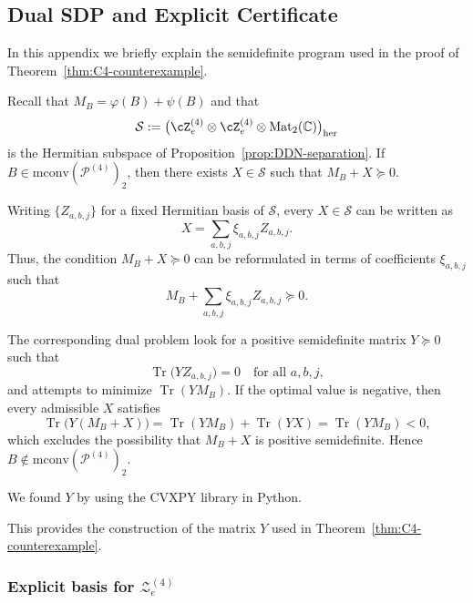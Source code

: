 \documentclass[11pt, a4paper]{article}
\theoremstyle{plain}
\theoremstyle{definition}
\theoremstyle{remark}
\newcommand{\C}{\mathbb{C}}
\newcommand{\cP}{\mathcal{P}} \newcommand{\cQ}{\mathcal{Q}} \newcommand{\cR}{\mathcal{R}}
\DeclareMathOperator{\Tr}{Tr}
\newcommand{\Mat}[2]{\operatorname{Mat}_{#2}\!\left(#1\right)}
\begin{document}
\subsection{Dual SDP and Explicit Certificate}\label{sec:dual-certificate}

In this appendix we briefly explain the semidefinite program used in the proof of
Theorem~\ref{thm:C4-counterexample}.

Recall that \(M_B = \varphi(B) + \psi(B)\) and that
\[
\mathcal{S}
 := \bigl(\cZ_e^{(4)} \otimes \cZ_e^{(4)}
          \otimes \Mat{\C}{2}\bigr)_{\mathrm{her}}
\]
is the Hermitian subspace of
Proposition~\ref{prop:DDN-separation}.
If \(B \in \mathrm{mconv}(\cP^{(4)})_2\), then there exists
\(X \in \mathcal{S}\) such that \(M_B + X \succeq 0\).

Writing \(\{Z_{a,b,j}\}\) for a fixed Hermitian basis of \(\mathcal{S}\),
every \(X \in \mathcal{S}\) can be written as
\[
X = \sum_{a,b,j} \xi_{a,b,j} Z_{a,b,j}.
\]
Thus, the condition \(M_B+X\succeq 0\) can be reformulated
in terms of coefficients \(\xi_{a,b,j}\) such that
\[
M_B + \sum_{a,b,j} \xi_{a,b,j} Z_{a,b,j} \succeq 0.
\]

The corresponding dual problem look for a positive semidefinite
matrix \(Y \succeq 0\) such that
\[
\Tr\!\bigl(Y Z_{a,b,j}\bigr) = 0
\quad\text{for all }a,b,j,
\]
and attempts to minimize \(\Tr(Y M_B)\).
If the optimal value is negative, then every admissible \(X\) satisfies
\[
\Tr\!\bigl(Y(M_B+X)\bigr)
 = \Tr(Y M_B) + \Tr(YX)
 = \Tr(Y M_B) < 0,
\]
which excludes the possibility that \(M_B + X\) is positive semidefinite.
Hence \(B \notin \mathrm{mconv}(\cP^{(4)})_2\).

We found \(Y\) by using the
CVXPY library in Python.  

This provides the construction of the matrix \(Y\) used in
Theorem~\ref{thm:C4-counterexample}.

\subsubsection{Explicit basis for \(\mathcal{Z}^{(4)}_e\)}
\label{sec:explicit-basis-Z4}
\end{document}
